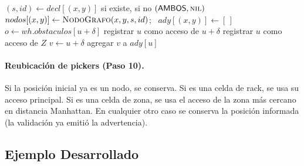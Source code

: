 \documentclass[11pt,a4paper]{article}
\theoremstyle{definition}
\newcommand{\sA}{\textsf{AMBOS}}
\newcommand{\CM}{\operatorname{CM}}
\begin{document}
\begin{algorithm}[H]
\caption{\textsc{Construir-Dígrafo}$(wh,\ decl)$}\label{alg:digrafo}
\begin{algorithmic}[1]
  
    \State $(s,id)\gets decl[(x,y)]$ si existe, si no $(\sA,\textsc{nil})$
    \State $nodos[(x,y)]\gets\textsc{NodoGrafo}(x,y,s,id)$; \ $ady[(x,y)]\gets[\,]$
  \EndIf
\EndFor \EndFor
{}
  \ForAll{$\delta\in\Delta$} 
    \State $o\gets wh.obstaculos[u+\delta]$
     registrar $u$ como acceso de $u+\delta$
     registrar $u$ como acceso de $Z$ \EndIf
  \EndFor
   
    \State $v\gets u+\delta$
    \If{$v\in nodos$ \textbf{y} $\neg\CM(\delta,\sigma(v))$ \textbf{y} $v\notin ady[u]$} agregar $v$ a $ady[u]$ \EndIf
  \EndFor
\EndFor
\end{algorithmic}
\end{algorithm}

\paragraph{Reubicación de pickers (Paso 10).} Si la posición inicial ya es un nodo, se conserva. Si es una celda de rack, se usa su acceso principal. Si es una celda de zona, se usa el acceso de la zona más cercano en distancia Manhattan. En cualquier otro caso se conserva la posición informada (la validación ya emitió la advertencia).

\subsection{Ejemplo Desarrollado}\label{sec:ejemplo}
\end{document}
